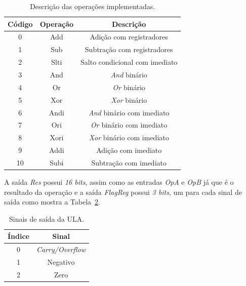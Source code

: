 \documentclass[11pt,a4paper,titlepage]{article}
\begin{document}
\begin{table}[h]
\centering
\begin{tabular}{| c | c | c |}
\hline
Código & Operação & Descrição\\
\hline
0 & Add & Adição com registradores \\
\hline
1 & Sub & Subtração com registradores \\
\hline
2 & Slti & Salto condicional com imediato \\
\hline
3 & And & \textit{And} binário \\
\hline
4 & Or & \textit{Or} binário  \\
\hline
5 & Xor & \textit{Xor} binário  \\
\hline
6 & Andi & \textit{And} binário com imediato \\
\hline
7 & Ori & \textit{Or} binário com imediato \\
\hline
8 & Xori & \textit{Xor} binário com imediato  \\
\hline
9 & Addi & Adição com imediato \\
\hline
10 & Subi & Subtração com imediato \\
\hline
\end{tabular}
\caption{Descrição das operações implementadas.}
\label{tab:ULA}
\end{table}
%

A saída \textit{Res} possui \textit{16 bits}, assim como as entradas \textit{OpA} e \textit{OpB} já que é o resultado da operação e a saída \textit{FlagReg} possui \textit{3 bits}, um para cada sinal de saída como mostra a Tabela~\ref{tab:flags}.

\begin{table}[h]
\centering
\begin{tabular}{| c | c |}
\hline
Índice & Sinal\\
\hline
0 & \textit{Carry/Overflow}\\
\hline
1 & Negativo \\
\hline
2 & Zero\\
\hline
\end{tabular}
\caption{Sinais de saída da ULA.}
\label{tab:flags}
\end{table}
%
\end{document}
